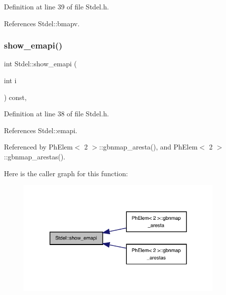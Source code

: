 Definition at line 39 of file Stdel.\+h.



References Stdel\+::bmapv.

\mbox{\label{classStdel_aca7fb885191a952c013e930521a42213}} 
\subsubsection{\texorpdfstring{show\+\_\+emapi()}{show\_emapi()}}
{\footnotesize\ttfamily int Stdel\+::show\+\_\+emapi (\begin{DoxyParamCaption}\item[{int}]{i }\end{DoxyParamCaption}) const\hspace{0.3cm}{\ttfamily [inline]}, {\ttfamily [inherited]}}



Definition at line 38 of file Stdel.\+h.



References Stdel\+::emapi.



Referenced by Ph\+Elem$<$ 2 $>$\+::gbnmap\+\_\+aresta(), and Ph\+Elem$<$ 2 $>$\+::gbnmap\+\_\+arestas().

Here is the caller graph for this function\+:
\nopagebreak
\begin{figure}[H]
\begin{center}
\leavevmode
\includegraphics[width=287pt]{classStdel_aca7fb885191a952c013e930521a42213_icgraph}
\end{center}
\end{figure}
\mbox{\label{classStdel_ad474ffc52b051ae8317b3fdb583c4c98}} 
